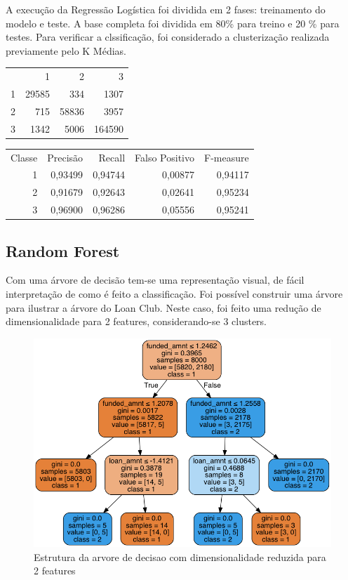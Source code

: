A execução da Regressão Logística foi dividida em 2 fases: treinamento do modelo e teste. A base completa foi dividida em 80\% para treino e 20 \% para testes. Para verificar a clssificação, foi considerado a clusterização realizada previamente pelo K Médias. 

\begin{tabular}{ r r r r }

         & 1 & 2 & 3 \\
    1    & 29585 & 334   & 1307  \\
    2    & 715   & 58836 & 3957  \\
    3    & 1342  & 5006  & 164590
\end{tabular}

\begin{tabular}{ r r r r r }

  Classe & Precisão & Recall  & Falso Positivo & F-measure  \\
    1    & 0,93499  & 0,94744 & 0,00877        & 0,94117    \\
    2    & 0,91679  & 0,92643 & 0,02641        & 0,95234    \\
    3    & 0,96900  & 0,96286 & 0,05556        & 0,95241
\end{tabular}

\subsection{Random Forest}


Com uma árvore de decisão tem-se uma representação visual, de fácil interpretação de como é feito a classificação. Foi possível construir uma árvore para ilustrar a árvore do Loan Club. Neste caso, foi feito uma redução de dimensionalidade para 2 features, considerando-se 3 clusters.

\begin{figure}[!ht]
\caption{Estrutura da arvore de decisao com dimensionalidade reduzida para 2 features}
\centerline{\includegraphics[width=1.05\textwidth]{img/loan}}
\end{figure}

